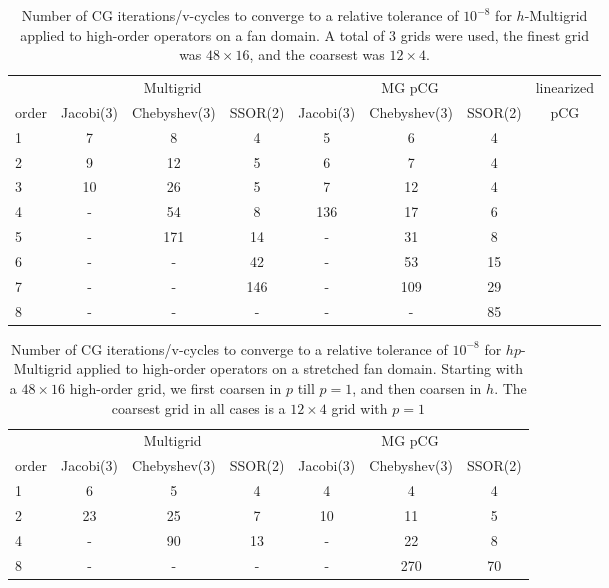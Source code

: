 \begin{table}
  \caption{\label{tab:homg} Number of CG iterations/v-cycles to converge to a relative tolerance of $10^{-8}$ for $h$-Multigrid applied to high-order operators on a fan domain. A total of 3 grids were used, the finest grid was $48\times 16$, and the coarsest was $12\times 4$.}
		\centering
    \begin{tabular}{|l|c|c|c|c|c|c|c|} 
	    \hline
				    & \multicolumn{3}{c|}{Multigrid} & \multicolumn{3}{c|}{MG pCG} & linearized \\  \cline{2-7}
			order & \scriptsize Jacobi(3)  &\scriptsize  Chebyshev(3)  &\scriptsize SSOR(2) &\scriptsize Jacobi(3)  &\scriptsize  Chebyshev(3)  &\scriptsize SSOR(2) & pCG \\
			\hline
      1 & 7  & 8  & 4 & 5 & 6 & 4     & \\ 
	    2 & 9  & 12 & 5 & 6 & 7 & 4     & \\	
			3 & 10 & 26 & 5 & 7 & 12 & 4    & \\
      4 & -  & 54 & 8 & 136 & 17 & 6  & \\
      5 & - & 171 & 14 & - & 31 & 8   & \\
      6 & - & - & 42 & - & 53 & 15    & \\
      7 & - & - & 146 & - & 109 & 29  & \\
      8 & - & - & -  & - & -  & 85    & \\
      \hline
	  \end{tabular}
\end{table}


\begin{table}
  \caption{\label{tab:hpmg} Number of CG iterations/v-cycles to converge to a relative tolerance of $10^{-8}$ for $hp$-Multigrid applied to high-order operators on a stretched fan domain. Starting with a $48\times 16$ high-order grid, we first coarsen in $p$ till $p=1$, and then coarsen in $h$. The coarsest grid in all cases is a $12\times 4$ grid with $p=1$}
		\centering
		\begin{tabular}{|l|c|c|c|c|c|c|} 
	    \hline
				    & \multicolumn{3}{c|}{Multigrid} & \multicolumn{3}{c|}{MG pCG}\\  \cline{2-7}
			order & \scriptsize Jacobi(3)  &\scriptsize  Chebyshev(3)  &\scriptsize SSOR(2) &\scriptsize Jacobi(3)  &\scriptsize  Chebyshev(3)  &\scriptsize SSOR(2) \\
			\hline
				1 & 6  &  5 &  4 & 4 & 4 & 4 \\ 
        2 & 23 & 25 & 7 & 10 & 11 & 5 \\
				4 & - & 90 & 13 & - & 22 & 8 \\
        8 & - & - & - & - & 270 & 70 \\
			\hline
	  \end{tabular}
\end{table}

